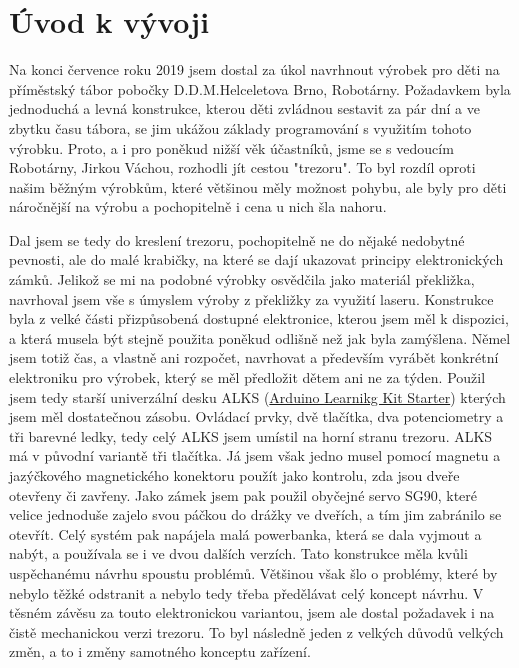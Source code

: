 \chapter*{Úvod k vývoji}



Na konci července roku 2019 jsem dostal za úkol navrhnout výrobek pro děti na příměstský tábor
pobočky D.D.M.Helceletova Brno, Robotárny. Požadavkem byla jednoduchá a levná konstrukce,
kterou děti zvládnou sestavit za pár dní a ve zbytku času tábora, se jim ukážou základy programování
s využitím tohoto výrobku. Proto, a i pro poněkud nižší věk účastníků, jsme se s vedoucím 
Robotárny, Jirkou Váchou, rozhodli jít cestou "trezoru". To byl rozdíl oproti našim běžným 
výrobkům, které většinou měly možnost pohybu, ale byly pro děti náročnější na výrobu
a pochopitelně i cena u nich šla nahoru.

Dal jsem se tedy do kreslení trezoru, pochopitelně ne do nějaké nedobytné pevnosti, ale do malé
krabičky, na které se dají ukazovat principy elektronických zámků. Jelikož se mi na podobné
výrobky osvědčila jako materiál překližka, navrhoval jsem vše s úmyslem výroby z překližky 
za využití laseru. Konstrukce byla z velké části přizpůsobená dostupné elektronice, kterou 
jsem měl k dispozici, a která musela být stejně použita poněkud odlišně než jak byla zamýšlena.
Němel jsem totiž čas, a vlastně ani rozpočet, navrhovat a především vyrábět konkrétní elektroniku
pro výrobek, který se měl předložit dětem ani ne za týden. Použil jsem tedy starší univerzální 
desku ALKS (\href{https://github.com/RoboticsBrno/ArduinoLearningKitStarter}{Arduino Learnikg Kit Starter})
kterých jsem měl dostatečnou zásobu. Ovládací prvky, dvě tlačítka, dva potenciometry a tři
barevné ledky, tedy celý ALKS jsem umístil na horní stranu trezoru. ALKS má v původní variantě
tři tlačítka. Já jsem však jedno musel pomocí magnetu a jazýčkového magnetického konektoru použít
jako kontrolu, zda jsou dveře otevřeny či zavřeny. Jako zámek jsem pak použil obyčejné servo
SG90, které velice jednoduše zajelo svou páčkou do drážky ve dveřích, a tím jim zabránilo 
se otevřít. Celý systém pak napájela malá powerbanka, která se dala vyjmout a nabýt, 
a používala se i ve dvou dalších verzích. Tato konstrukce měla kvůli uspěchanému návrhu 
spoustu problémů. Většinou však šlo o problémy, které by nebylo těžké odstranit a nebylo
tedy třeba předělávat celý koncept návrhu. V těsném závěsu za touto elektronickou variantou,
jsem ale dostal požadavek i na čistě mechanickou verzi trezoru. To byl následně jeden z 
velkých důvodů velkých změn, a to i změny samotného konceptu zařízení.

\newpage